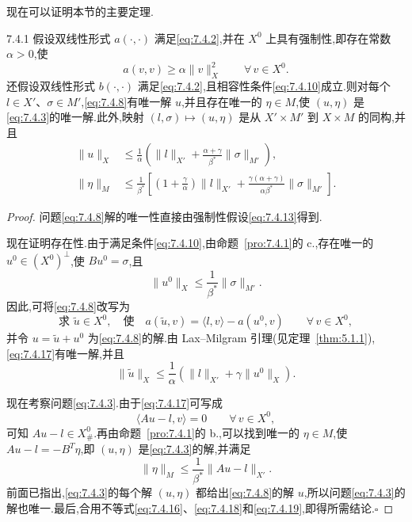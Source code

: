 现在可以证明本节的主要定理.

\begin{theorem}[]{7.4.1}
假设双线性形式 \(a(\cdot,\cdot)\) 满足\eqref{eq:7.4.2},并在 \(X^0\) 上具有强制性,即存在常数 \(\alpha>0\),使
\begin{equation}\label{eq:7.4.13}
  a(v,v)\ge\alpha\|v\|_X^2\qquad\forall\,v\in X^0.
\end{equation}
还假设双线性形式 \(b(\cdot,\cdot)\) 满足\eqref{eq:7.4.2},且相容性条件\eqref{eq:7.4.10}成立.则对每个 \(l\in X'\)、\(\sigma\in M'\),\eqref{eq:7.4.8}有唯一解 \(u\),并且存在唯一的 \(\eta\in M\),使 \((u,\eta)\) 是\eqref{eq:7.4.3}的唯一解.此外,映射 \((l,\sigma)\mapsto(u,\eta)\) 是从 \(X'\times M'\) 到 \(X\times M\) 的同构,并且
\begin{align}
  \|u\|_X&\le\frac1\alpha
    \left(\|l\|_{X'}+\frac{\alpha+\gamma}{\beta^*}\|\sigma\|_{M'}\right),\label{eq:7.4.14}\\
  \|\eta\|_M&\le\frac1{\beta^*}
    \left[\left(1+\frac{\gamma}{\alpha}\right)\|l\|_{X'}
       +\frac{\gamma(\alpha+\gamma)}{\alpha\beta^*}\|\sigma\|_{M'}\right].\label{eq:7.4.15}
\end{align}
\end{theorem}

\begin{proof}
问题\eqref{eq:7.4.8}解的唯一性直接由强制性假设\eqref{eq:7.4.13}得到.

现在证明存在性.由于满足条件\eqref{eq:7.4.10},由命题~\ref{pro:7.4.1}的 c.,存在唯一的 \(u^0\in(X^0)^\perp\),使 \(Bu^0=\sigma\),且
\begin{equation}\label{eq:7.4.16}
  \|u^0\|_X\le\frac1{\beta^*}\|\sigma\|_{M'}.
\end{equation}
因此,可将\eqref{eq:7.4.8}改写为
\begin{equation}\label{eq:7.4.17}
  \text{求 }\widetilde u\in X^0,\quad\text{使}\quad
    a(\widetilde u,v)=\langle l,v\rangle-a(u^0,v)\qquad\forall\,v\in X^0,
\end{equation}
并令 \(u=\widetilde u+u^0\) 为\eqref{eq:7.4.8}的解.由 Lax--Milgram 引理(见定理~\ref{thm:5.1.1}),\eqref{eq:7.4.17}有唯一解,并且
\begin{equation}\label{eq:7.4.18}
  \|\widetilde u\|_X\le\frac1\alpha(\|l\|_{X'}+\gamma\|u^0\|_X).
\end{equation}

现在考察问题\eqref{eq:7.4.3}.由于\eqref{eq:7.4.17}可写成
\[
  \langle Au-l,v\rangle=0\qquad\forall\,v\in X^0,
\]
可知 \(Au-l\in X_\#^0\).再由命题~\ref{pro:7.4.1}的 b.,可以找到唯一的 \(\eta\in M\),使 \(Au-l=-B^T\eta\),即 \((u,\eta)\) 是\eqref{eq:7.4.3}的解,并满足
\begin{equation}\label{eq:7.4.19}
  \|\eta\|_M\le\frac1{\beta^*}\|Au-l\|_{X'}.
\end{equation}
前面已指出,\eqref{eq:7.4.3}的每个解 \((u,\eta)\) 都给出\eqref{eq:7.4.8}的解 \(u\),所以问题\eqref{eq:7.4.3}的解也唯一.最后,合用不等式\eqref{eq:7.4.16}、\eqref{eq:7.4.18}和\eqref{eq:7.4.19},即得所需结论.\hfill\(\square\)
\end{proof}

